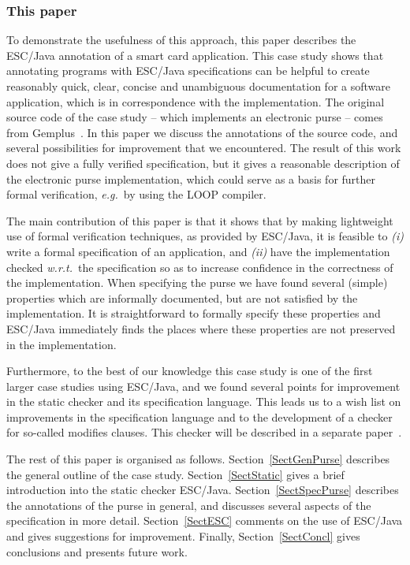 \documentclass[a4paper]{llncs}
\begin{document}
\subsubsection{This paper}
To demonstrate the usefulness of this approach, this paper describes
the ESC/Java annotation of a smart card application. This case study
shows that annotating programs with ESC/Java specifications can be
helpful to create reasonably quick, clear, concise and unambiguous
documentation for a software application, which is in correspondence
with the implementation.  The original source code of the case study
-- which implements an electronic purse -- comes from
Gemplus~\cite{PurseUrl}. In this paper we discuss the annotations of
the source code, and several possibilities for improvement that we
encountered.  The result of this work does not give a fully verified
specification, but it gives a reasonable description of the electronic
purse implementation, which could serve as a basis for further formal
verification, \emph{e.g.}~by using the LOOP compiler.

The main contribution of this paper is that it shows that by making
light\-weight use of formal verification techniques, as provided by
ESC/Java, it is feasible to
\emph{(i)} write a formal specification of an application, and
\emph{(ii)} have the implementation checked \emph{w.r.t.}~the 
specification so as to increase confidence in the correctness of the
implementation. When specifying the purse we have found several
(simple) properties which are informally documented, but are not
satisfied by the implementation. It is straightforward to formally
specify these properties and ESC/Java immediately finds the places
where these properties are not preserved in the implementation.

Furthermore, to the best of our knowledge this case study is one of
the first larger case studies using ESC/Java, and we found several
points for improvement in the static checker and its specification
language. This leads us to a wish list on improvements in the
specification language and to the development of a checker for
so-called modifies clauses. This checker will be described in a
separate paper~\cite{CatanoH02b}.%

The rest of this paper is organised as
follows. Section~\ref{SectGenPurse} describes the general outline of
the case study. Section~\ref{SectStatic} gives a brief introduction
into the static checker ESC/Java.  Section~\ref{SectSpecPurse}
describes the annotations of the purse in general, and discusses
several aspects of the specification in more
detail. Section~\ref{SectESC} comments on the use of ESC/Java and
gives suggestions for improvement. Finally, Section~\ref{SectConcl}
gives conclusions and presents future work.
\end{document}
